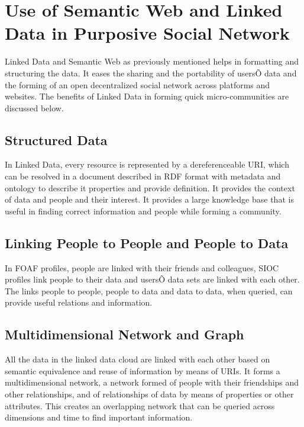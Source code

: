 \section{Use of Semantic Web and Linked Data in Purposive Social Network}

Linked Data and Semantic Web as previously mentioned helps in formatting and structuring the data. It eases the sharing and the portability of usersÕ data and the forming of an open decentralized social network across platforms and websites. The benefits of Linked Data in forming quick micro-communities are discussed below.

\subsection{Structured Data}

In Linked Data, every resource is represented by a dereferenceable URI, which can be resolved in a document described in RDF format with metadata and ontology to describe it properties and provide definition. It provides the context of data and people and their interest. It provides a large knowledge base that is useful in finding correct information and people while forming a community.

\subsection{Linking People to People and People to Data}

In FOAF profiles, people are linked with their friends and colleagues, SIOC profiles link people to their data and usersÕ data sets are linked with each other. The links people to people, people to data and data to data, when queried, can provide useful relations and information.


\subsection{Multidimensional Network and Graph}

All the data in the linked data cloud are linked with each other based on semantic equivalence and reuse of information by means of URIs. It forms a multidimensional network, a network formed of people with their friendships and other relationships, and of relationships of data by means of properties or other attributes. This creates an overlapping network that can be queried across dimensions and time to find important information.


